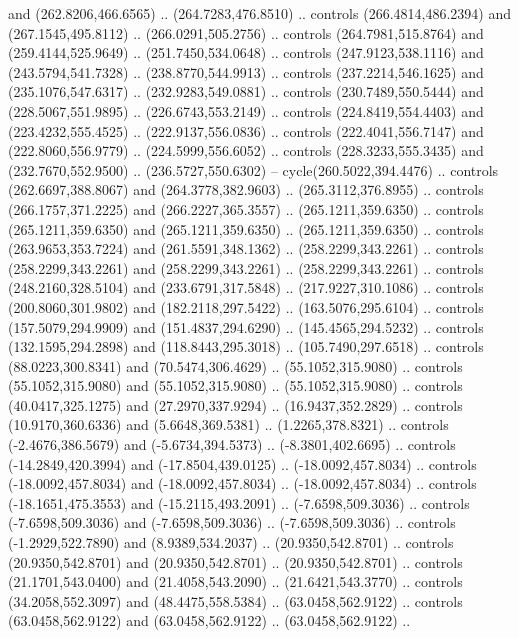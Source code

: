 \begin{scope}[shift={(69.41462,-293.94043)}]
    and (262.8206,466.6565) .. (264.7283,476.8510) .. controls (266.4814,486.2394)
    and (267.1545,495.8112) .. (266.0291,505.2756) .. controls (264.7981,515.8764)
    and (259.4144,525.9649) .. (251.7450,534.0648) .. controls (247.9123,538.1116)
    and (243.5794,541.7328) .. (238.8770,544.9913) .. controls (237.2214,546.1625)
    and (235.1076,547.6317) .. (232.9283,549.0881) .. controls (230.7489,550.5444)
    and (228.5067,551.9895) .. (226.6743,553.2149) .. controls (224.8419,554.4403)
    and (223.4232,555.4525) .. (222.9137,556.0836) .. controls (222.4041,556.7147)
    and (222.8060,556.9779) .. (224.5999,556.6052) .. controls (228.3233,555.3435)
    and (232.7670,552.9500) .. (236.5727,550.6302) -- cycle(260.5022,394.4476) ..
    controls (262.6697,388.8067) and (264.3778,382.9603) .. (265.3112,376.8955) ..
    controls (266.1757,371.2225) and (266.2227,365.3557) .. (265.1211,359.6350) ..
    controls (265.1211,359.6350) and (265.1211,359.6350) .. (265.1211,359.6350) ..
    controls (263.9653,353.7224) and (261.5591,348.1362) .. (258.2299,343.2261) ..
    controls (258.2299,343.2261) and (258.2299,343.2261) .. (258.2299,343.2261) ..
    controls (248.2160,328.5104) and (233.6791,317.5848) .. (217.9227,310.1086) ..
    controls (200.8060,301.9802) and (182.2118,297.5422) .. (163.5076,295.6104) ..
    controls (157.5079,294.9909) and (151.4837,294.6290) .. (145.4565,294.5232) ..
    controls (132.1595,294.2898) and (118.8443,295.3018) .. (105.7490,297.6518) ..
    controls (88.0223,300.8341) and (70.5474,306.4629) .. (55.1052,315.9080) ..
    controls (55.1052,315.9080) and (55.1052,315.9080) .. (55.1052,315.9080) ..
    controls (40.0417,325.1275) and (27.2970,337.9294) .. (16.9437,352.2829) ..
    controls (10.9170,360.6336) and (5.6648,369.5381) .. (1.2265,378.8321) ..
    controls (-2.4676,386.5679) and (-5.6734,394.5373) .. (-8.3801,402.6695) ..
    controls (-14.2849,420.3994) and (-17.8504,439.0125) .. (-18.0092,457.8034) ..
    controls (-18.0092,457.8034) and (-18.0092,457.8034) .. (-18.0092,457.8034) ..
    controls (-18.1651,475.3553) and (-15.2115,493.2091) .. (-7.6598,509.3036) ..
    controls (-7.6598,509.3036) and (-7.6598,509.3036) .. (-7.6598,509.3036) ..
    controls (-1.2929,522.7890) and (8.9389,534.2037) .. (20.9350,542.8701) ..
    controls (20.9350,542.8701) and (20.9350,542.8701) .. (20.9350,542.8701) ..
    controls (21.1701,543.0400) and (21.4058,543.2090) .. (21.6421,543.3770) ..
    controls (34.2058,552.3097) and (48.4475,558.5384) .. (63.0458,562.9122) ..
    controls (63.0458,562.9122) and (63.0458,562.9122) .. (63.0458,562.9122) ..

\end{scope}
